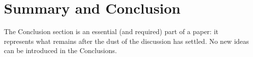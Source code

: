 
\chapter{Summary and Conclusion} %

\label{Chapter6} %



\begin{multicols}{2}

\noindent
The Conclusion section is an essential (and required) part of a paper: it represents what remains after the dust of the discussion has settled. No new ideas can be introduced in the Conclusions.

\end{multicols}